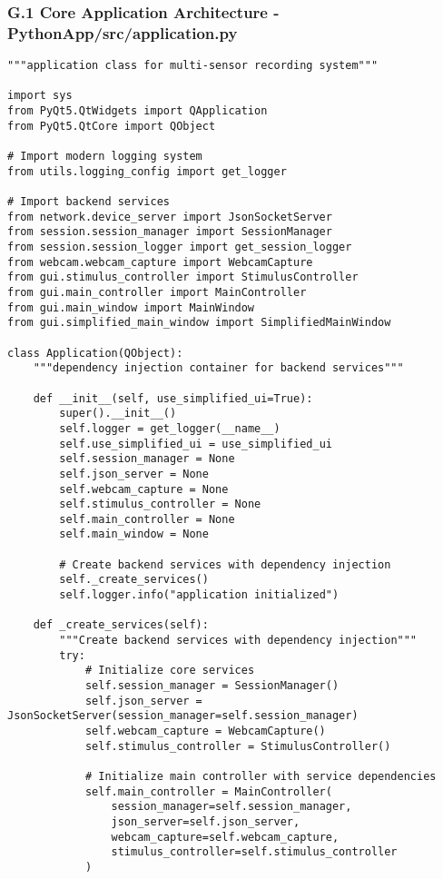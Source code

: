\documentclass[12pt,a4paper]{article}
\begin{document}
{{\subsubsection{G.1 Core Application Architecture - PythonApp/src/application.py}

\begin{verbatim}
"""application class for multi-sensor recording system"""

import sys
from PyQt5.QtWidgets import QApplication
from PyQt5.QtCore import QObject

# Import modern logging system
from utils.logging_config import get_logger

# Import backend services
from network.device_server import JsonSocketServer
from session.session_manager import SessionManager
from session.session_logger import get_session_logger
from webcam.webcam_capture import WebcamCapture
from gui.stimulus_controller import StimulusController
from gui.main_controller import MainController
from gui.main_window import MainWindow
from gui.simplified_main_window import SimplifiedMainWindow

class Application(QObject):
    """dependency injection container for backend services"""
    
    def __init__(self, use_simplified_ui=True):
        super().__init__()
        self.logger = get_logger(__name__)
        self.use_simplified_ui = use_simplified_ui
        self.session_manager = None
        self.json_server = None
        self.webcam_capture = None
        self.stimulus_controller = None
        self.main_controller = None
        self.main_window = None
        
        # Create backend services with dependency injection
        self._create_services()
        self.logger.info("application initialized")
    
    def _create_services(self):
        """Create backend services with dependency injection"""
        try:
            # Initialize core services
            self.session_manager = SessionManager()
            self.json_server = JsonSocketServer(session_manager=self.session_manager)
            self.webcam_capture = WebcamCapture()
            self.stimulus_controller = StimulusController()
            
            # Initialize main controller with service dependencies
            self.main_controller = MainController(
                session_manager=self.session_manager,
                json_server=self.json_server,
                webcam_capture=self.webcam_capture,
                stimulus_controller=self.stimulus_controller
            )
            

\end{verbatim}}}
\end{document}
